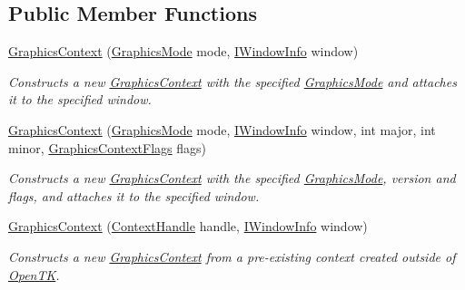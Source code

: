 \subsection*{Public Member Functions}
\begin{DoxyCompactItemize}
\item 
\hyperlink{class_open_t_k_1_1_graphics_1_1_graphics_context_a7954c5ce8c3bce5a0273f3ff22068186}{Graphics\-Context} (\hyperlink{class_open_t_k_1_1_graphics_1_1_graphics_mode}{Graphics\-Mode} mode, \hyperlink{interface_open_t_k_1_1_platform_1_1_i_window_info}{I\-Window\-Info} window)
\begin{DoxyCompactList}\small\item\em Constructs a new \hyperlink{class_open_t_k_1_1_graphics_1_1_graphics_context}{Graphics\-Context} with the specified \hyperlink{class_open_t_k_1_1_graphics_1_1_graphics_mode}{Graphics\-Mode} and attaches it to the specified window. \end{DoxyCompactList}\item 
\hyperlink{class_open_t_k_1_1_graphics_1_1_graphics_context_aaeb217a1cc05317ad1798c941aeee99d}{Graphics\-Context} (\hyperlink{class_open_t_k_1_1_graphics_1_1_graphics_mode}{Graphics\-Mode} mode, \hyperlink{interface_open_t_k_1_1_platform_1_1_i_window_info}{I\-Window\-Info} window, int major, int minor, \hyperlink{namespace_open_t_k_1_1_graphics_a518f77952bc406a013160356981ea8ab}{Graphics\-Context\-Flags} flags)
\begin{DoxyCompactList}\small\item\em Constructs a new \hyperlink{class_open_t_k_1_1_graphics_1_1_graphics_context}{Graphics\-Context} with the specified \hyperlink{class_open_t_k_1_1_graphics_1_1_graphics_mode}{Graphics\-Mode}, version and flags, and attaches it to the specified window. \end{DoxyCompactList}\item 
\hyperlink{class_open_t_k_1_1_graphics_1_1_graphics_context_a0232374e017976be588e2fe7f069d9b4}{Graphics\-Context} (\hyperlink{struct_open_t_k_1_1_context_handle}{Context\-Handle} handle, \hyperlink{interface_open_t_k_1_1_platform_1_1_i_window_info}{I\-Window\-Info} window)
\begin{DoxyCompactList}\small\item\em Constructs a new \hyperlink{class_open_t_k_1_1_graphics_1_1_graphics_context}{Graphics\-Context} from a pre-\/existing context created outside of \hyperlink{namespace_open_t_k}{Open\-T\-K}. \end{DoxyCompactList}\item 

\end{DoxyCompactItemize}
